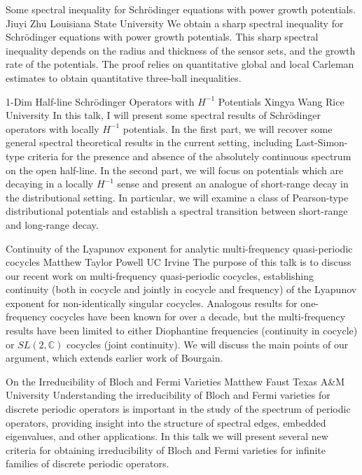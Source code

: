 \begin{addmargin}[2em]{0em}
\vspace{2ex}
\abs
{Some spectral inequality for Schrödinger equations with power growth potentials.}
{Jiuyi Zhu}
{Louisiana State University}
{We obtain a sharp spectral inequality for Schrödinger equations with power growth potentials. This sharp spectral inequality depends on the radius and thickness of the sensor sets, and the growth rate of the potentials. The proof relies on quantitative global and local Carleman estimates to obtain quantitative three-ball inequalities.}


\vspace{1.5ex}
\abs
{1-Dim Half-line Schrödinger Operators with $H^{-1}$ Potentials}
{Xingya Wang}
{Rice University}
{In this talk, I will present some spectral results of Schrödinger operators with locally $H^{-1}$ potentials. In the first part, we will recover some general spectral theoretical results in the current setting, including Last-Simon-type criteria for the presence and absence of the absolutely continuous spectrum on the open half-line. In the second part, we will focus on potentials which are decaying in a locally $H^{-1}$ sense and present an analogue of short-range decay in the distributional setting. In particular, we will examine a class of Pearson-type distributional potentials and establish a spectral transition between short-range and long-range decay.}


\vspace{1.5ex}
\abs
{Continuity of the Lyapunov exponent for analytic multi-frequency quasi-periodic cocycles}
{Matthew Taylor Powell}
{UC Irvine}
{
The purpose of this talk is to discuss our recent work on multi-frequency quasi-periodic cocycles, establishing continuity (both in cocycle and jointly in cocycle and frequency) of the Lyapunov exponent for non-identically singular cocycles. Analogous results for one-frequency cocycles have been known for over a decade, but the multi-frequency results have been limited to either Diophantine frequencies (continuity in cocycle) or $SL(2,\mathbb C)$ cocycles (joint continuity). We will discuss the main points of our argument, which extends earlier work of Bourgain.}


\vspace{1.5ex}
\abs
{On the Irreducibility of Bloch and Fermi Varieties}
{Matthew Faust}
{Texas A\&M University}
{Understanding the irreducibility of Bloch and Fermi varieties for discrete periodic operators is important in the study of the spectrum of periodic operators, providing insight into the structure of spectral edges, embedded eigenvalues, and other applications.  In this talk we will present several new criteria for obtaining irreducibility of Bloch and Fermi varieties for infinite families of discrete periodic operators.}



\end{addmargin}
